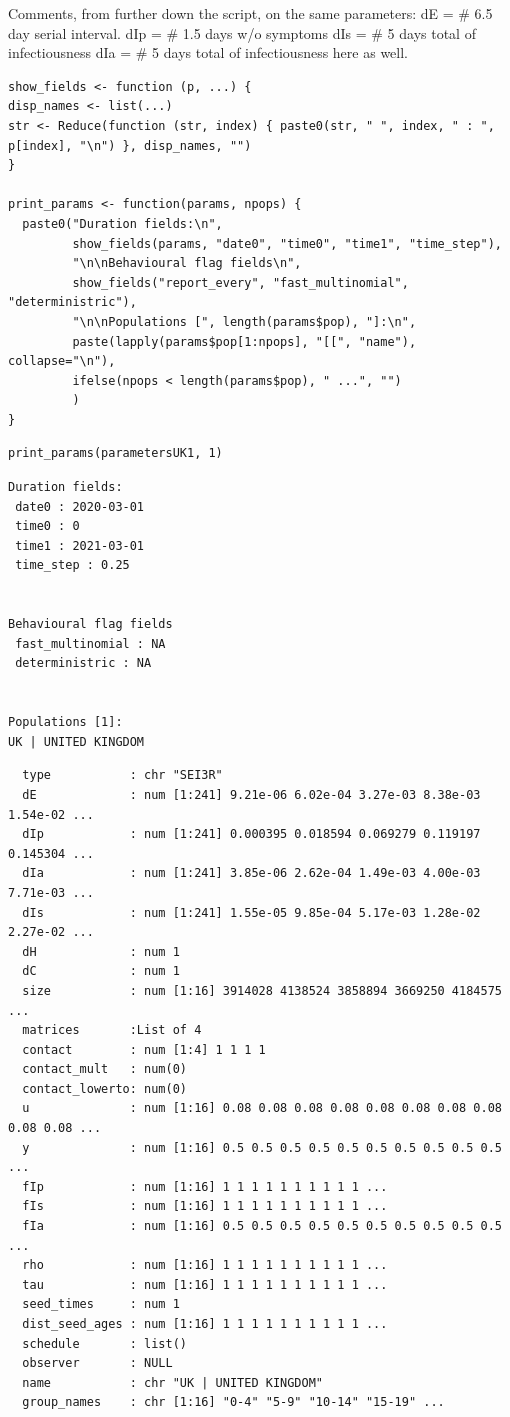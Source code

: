 \documentclass[11pt]{article}
\begin{document}
Comments, from further down the script, on the same parameters:
dE  = \# 6.5 day serial interval.
dIp = \# 1.5 days w/o symptoms
dIs = \# 5 days total of infectiousness
dIa = \# 5 days total of infectiousness here as well.

\begin{verbatim}
show_fields <- function (p, ...) {
disp_names <- list(...)
str <- Reduce(function (str, index) { paste0(str, " ", index, " : ", p[index], "\n") }, disp_names, "")
}

print_params <- function(params, npops) {
  paste0("Duration fields:\n",
         show_fields(params, "date0", "time0", "time1", "time_step"),
         "\n\nBehavioural flag fields\n",
         show_fields("report_every", "fast_multinomial", "deterministric"),
         "\n\nPopulations [", length(params$pop), "]:\n",
         paste(lapply(params$pop[1:npops], "[[", "name"), collapse="\n"),
         ifelse(npops < length(params$pop), " ...", "")
         )
}
\end{verbatim}

\begin{verbatim}
print_params(parametersUK1, 1)
\end{verbatim}

\begin{verbatim}
Duration fields:
 date0 : 2020-03-01
 time0 : 0
 time1 : 2021-03-01
 time_step : 0.25


Behavioural flag fields
 fast_multinomial : NA
 deterministric : NA


Populations [1]:
UK | UNITED KINGDOM
\end{verbatim}

\begin{verbatim}
  type           : chr "SEI3R"
  dE             : num [1:241] 9.21e-06 6.02e-04 3.27e-03 8.38e-03 1.54e-02 ...
  dIp            : num [1:241] 0.000395 0.018594 0.069279 0.119197 0.145304 ...
  dIa            : num [1:241] 3.85e-06 2.62e-04 1.49e-03 4.00e-03 7.71e-03 ...
  dIs            : num [1:241] 1.55e-05 9.85e-04 5.17e-03 1.28e-02 2.27e-02 ...
  dH             : num 1
  dC             : num 1
  size           : num [1:16] 3914028 4138524 3858894 3669250 4184575 ...
  matrices       :List of 4
  contact        : num [1:4] 1 1 1 1
  contact_mult   : num(0) 
  contact_lowerto: num(0) 
  u              : num [1:16] 0.08 0.08 0.08 0.08 0.08 0.08 0.08 0.08 0.08 0.08 ...
  y              : num [1:16] 0.5 0.5 0.5 0.5 0.5 0.5 0.5 0.5 0.5 0.5 ...
  fIp            : num [1:16] 1 1 1 1 1 1 1 1 1 1 ...
  fIs            : num [1:16] 1 1 1 1 1 1 1 1 1 1 ...
  fIa            : num [1:16] 0.5 0.5 0.5 0.5 0.5 0.5 0.5 0.5 0.5 0.5 ...
  rho            : num [1:16] 1 1 1 1 1 1 1 1 1 1 ...
  tau            : num [1:16] 1 1 1 1 1 1 1 1 1 1 ...
  seed_times     : num 1
  dist_seed_ages : num [1:16] 1 1 1 1 1 1 1 1 1 1 ...
  schedule       : list()
  observer       : NULL
  name           : chr "UK | UNITED KINGDOM"
  group_names    : chr [1:16] "0-4" "5-9" "10-14" "15-19" ...
\end{verbatim}
\end{document}
